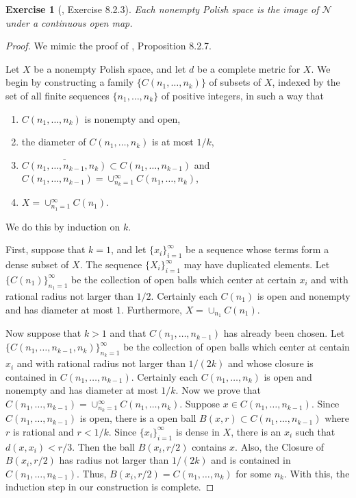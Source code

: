 \documentclass[11pt]{article}
\theoremstyle{plain}
\newtheorem{exercise}{Exercise}
\theoremstyle{definition}
\theoremstyle{remark}
\begin{document}
\begin{exercise}[\cite{book:992991}, Exercise 8.2.3]
    Each nonempty Polish space is the image of $\mathscr N$ under a continuous open map.
\end{exercise}
\begin{proof}
    We mimic the proof of \cite{book:992991}, Proposition 8.2.7.

    Let $X$ be a nonempty Polish space, and let $d$ be a complete metric for $X$.
    We begin by constructing a family $\{C(n_1,\dots,n_k)\}$ of subsets of $X$, indexed by the set of all finite sequences $\{n_1,\dots,n_k\}$ of positive integers, in such a way that
    \begin{enumerate}[1.]
        \item 
            $C(n_1,\dots,n_k)$ is nonempty and open,
        \item
            the diameter of $C(n_1,\dots,n_k)$ is at most $1/k$,
        \item
            $\overline{C(n_1,\dots,n_{k-1},n_k)} \subset C(n_1,\dots,n_{k-1})$ 
            and
            $C(n_1,\dots,n_{k-1})=\cup_{n_k=1}^\infty C(n_1,\dots,n_k)$,
        \item
            $X=\cup_{n_1=1}^\infty C(n_1)$.
    \end{enumerate}
    We do this by induction on $k$.

    First, suppose that $k=1$, and let $\{x_{i}\}_{i=1}^\infty$ be a sequence whose terms form a dense subset of $X$.
    The sequence $\{X_{i}\}_{i=1}^\infty$ may have duplicated elements.
    Let $\{C(n_1)\}_{n_1=1}^\infty$ be the collection of open balls which center at certain $x_i$ and with rational radius not larger than $1/2$.
    Certainly each $C(n_1)$ is open and nonempty and has diameter at most $1$.
    Furthermore, $X=\cup_{n_1}C(n_1)$.

    Now suppose that $k>1$ and that $C(n_1,\dots,n_{k-1})$ has already been chosen.
    Let $\{C\left( n_1,\dots,n_{k-1}, n_k \right)\}_{n_k=1}^\infty$ be the collection of open balls which center at centain $x_i$ and with rational radius not larger than $1/(2k)$ and whose closure is contained in $C(n_1,\dots,n_{k-1})$.
    Certainly each $C(n_1,\dots,n_{k})$ is open and nonempty and has diameter at most $1/k$.
    Now we prove that $C(n_1,\dots,n_{k-1})=\cup_{n_k=1}^\infty C(n_1,\dots,n_k)$.
    Suppose $x\in C(n_1,\dots,n_{k-1})$.
    Since $C(n_1,\dots,n_{k-1})$ is open, there is a open ball $B(x,r) \subset C(n_1,\dots,n_{k-1})$ where $r$ is rational and $r<1/k$.
    Since $\{x_i\}_{i=1}^\infty$ is dense in $X$, there is an $x_i$ such that $d(x,x_i)< r/3$.
    Then the ball $B(x_i,r/2)$ contains $x$.
    Also, the Closure of $B(x_i,r/2)$ has radius not larger than $1/(2k)$ and is contained in $C(n_1,\dots,n_{k-1})$.
    Thus, $B(x_i,r/2)=C(n_1,\dots,n_k)$ for some $n_k$.
    With this, the induction step in our construction is complete.


\end{proof}
\end{document}
